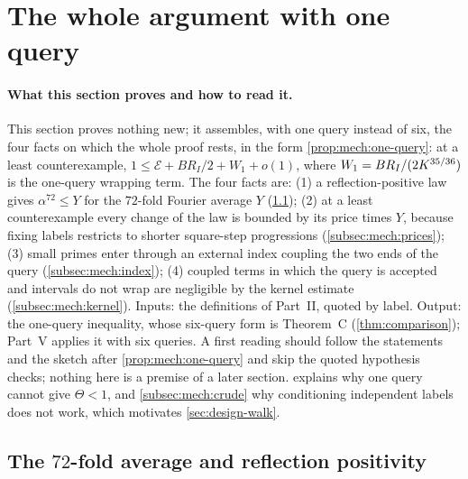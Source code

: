 \providecommand{\PushK}{890666}
\providecommand{\PushTheta}{0.99999999997327}

\section{The whole argument with one query}
\label{sec:mechanism}

\paragraph{What this section proves and how to read it.}
This section proves nothing new; it assembles, with one query instead
of six, the four facts on which the whole proof rests, in the form
\cref{prop:mech:one-query}: at a least counterexample,
$1\le\mathcal E+BR_I/2+W_1+o(1)$, where
$W_1=BR_I/(2K^{35/36})$ is the one-query wrapping term. The
four facts are: (1) a
reflection-positive law gives $\alpha^{72}\le Y$ for the $72$-fold
Fourier average $Y$ (\cref{subsec:mech:chessboard}); (2) at a least
counterexample every change of the law is bounded by its price times
$Y$, because fixing labels restricts to shorter square-step
progressions (\cref{subsec:mech:prices}); (3) small primes enter
through an external index coupling the two ends of the query
(\cref{subsec:mech:index}); (4) coupled terms in which the query is
accepted and intervals do not wrap are negligible by the kernel
estimate (\cref{subsec:mech:kernel}). Inputs: the definitions of
Part~II, quoted by label. Output: the one-query inequality, whose
six-query form is Theorem~C (\cref{thm:comparison}); Part~V applies
it with six queries. A first reading should follow the statements and
the sketch after \cref{prop:mech:one-query} and skip the quoted
hypothesis checks; nothing here is a premise of a later section.
 explains why one query cannot give
$\Theta<1$, and \cref{subsec:mech:crude} why conditioning independent
labels does not work, which motivates \cref{sec:design-walk}.

\subsection{The \texorpdfstring{$72$}{72}-fold average and reflection positivity}\label{subsec:mech:chessboard}

